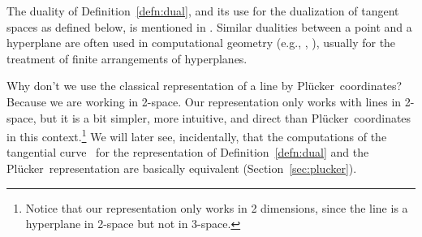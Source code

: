 \documentclass[11pt]{article}
\newcommand{\plucker}{Pl\"{u}cker\ }
\newcommand{\tang}{tangential curve\ }
\begin{document}
\begin{rmk}
The duality of Definition~\ref{defn:dual}, 
and its use for the dualization of tangent spaces as defined
below, is mentioned in \cite[p. 54]{hartshorne}.
Similar dualities between a point and a hyperplane 
are often used in computational geometry
(e.g., \cite[p. 214]{orourke94}, \cite{Edelsbrunner if we can get it}),
usually for the treatment of finite arrangements of hyperplanes.

Why don't we use the classical representation of a line by \plucker coordinates?
Because we are working in 2-space.
Our representation only works with lines in 2-space,
but it is a bit simpler, more intuitive, and direct than \plucker coordinates 
in this context.\footnote{Notice that our representation only works in 2 dimensions, 
	since the line is a hyperplane in 2-space but not in 3-space.}
We will later see, incidentally, that the computations of the \tang 
for the representation of Definition~\ref{defn:dual} 
and the \plucker representation are
basically equivalent (Section~\ref{sec:plucker}).
\end{rmk}
\end{document}
